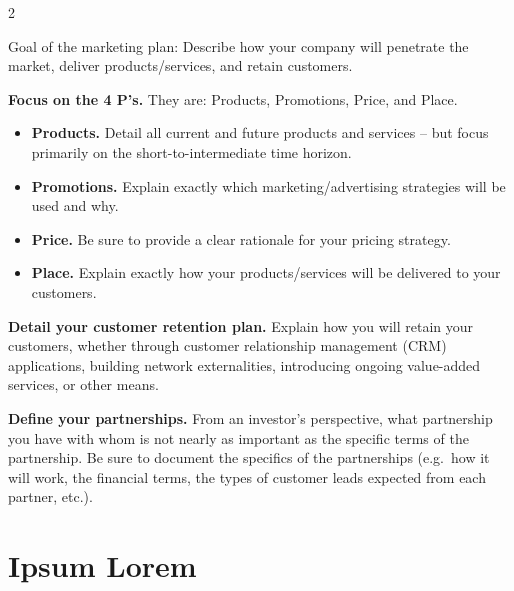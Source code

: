 \documentclass[9pt,]{book}
\providecommand{\tightlist}{%
  \setlength{\itemsep}{0pt}\setlength{\parskip}{0pt}}
\begin{document}
\begin {multicols}{2}

Goal of the marketing plan: Describe how your company will penetrate the
market, deliver products/services, and retain customers.

\textbf{Focus on the 4 P's.} They are: Products, Promotions, Price, and
Place.

\begin{itemize}
\tightlist
\item
  \textbf{Products.} Detail all current and future products and services
  -- but focus primarily on the short-to-intermediate time horizon.
\item
  \textbf{Promotions.} Explain exactly which marketing/advertising
  strategies will be used and why.
\item
  \textbf{Price.} Be sure to provide a clear rationale for your pricing
  strategy.
\item
  \textbf{Place.} Explain exactly how your products/services will be
  delivered to your customers.
\end{itemize}

\textbf{Detail your customer retention plan.} Explain how you will
retain your customers, whether through customer relationship management
(CRM) applications, building network externalities, introducing ongoing
value-added services, or other means.

\textbf{Define your partnerships.} From an investor's perspective, what
partnership you have with whom is not nearly as important as the
specific terms of the partnership. Be sure to document the specifics of
the partnerships (e.g.~how it will work, the financial terms, the types
of customer leads expected from each partner, etc.).

\end {multicols}

\hypertarget{ipsum-lorem}{%
\section{Ipsum Lorem}\label{ipsum-lorem}}
\end{document}
